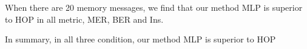 When there are 20 memory messages, we find that our method MLP is superior to HOP in all metric, MER, BER and Ins.


In summary, in all three condition, our method MLP is superior to HOP 